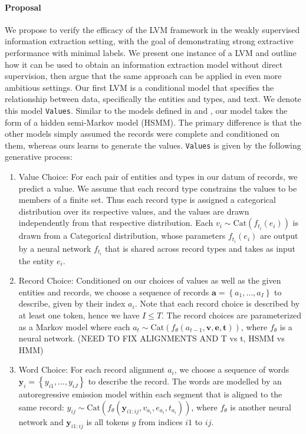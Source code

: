 \documentclass[11pt]{article}
\newcommand\set[1]{\left\{#1\right\}}
\newcommand{\Cat}{\mathrm{Cat}}
\newcommand{\ba}{\mathbf{a}}
\newcommand{\be}{\mathbf{e}}
\newcommand{\bt}{\mathbf{t}}
\newcommand{\bv}{\mathbf{v}}
\newcommand{\by}{\mathbf{y}}
\begin{document}
\paragraph{Proposal}
We propose to verify the efficacy of the LVM framework in the
weakly supervised information extraction setting,
with the goal of demonstrating strong extractive performance with minimal labels.
We present one instance of a LVM and outline how it can be used to obtain
an information extraction model without direct supervision,
then argue that the same approach can be applied in even more ambitious settings.
Our first LVM is a conditional model that specifies
the relationship between data, specifically the entities and types, and text.
We denote this model \texttt{Values}.
Similar to the models defined in \citet{wiseman2018template} and \citet{liang2009semalign},
our model takes the form of a hidden semi-Markov model (HSMM).
The primary difference is that the other models simply assumed the records
were complete and conditioned on them, whereas ours learns to generate the values.
\texttt{Values} is given by the following generative process:
\begin{enumerate}
\item Value Choice:
For each pair of entities and types in our datum of records, we predict a value.
We assume that each record type constrains the values to be members of a finite set.
Thus each record type is assigned a categorical distribution over its respective values,
and the values are drawn independently from that respective distribution.
Each $v_i\sim\Cat(f_{t_i}(e_i))$ is drawn from a Categorical distribution,
whose parameters $f_{t_i}(e_i)$ are output by a neural network $f_{t_i}$ that is shared across record types
and takes as input the entity $e_i$.
\item Record Choice:
Conditioned on our choices of values as well as the given entities and records,
we choose a sequence of records $\ba = \set{a_1,\ldots,a_I}$ to describe,
given by their index $a_i$.
Note that each record choice is described by at least one token, hence we have $I \le T$.
The record choices are parameterized as a Markov model where each
$a_t\sim\Cat(f_\theta(a_{t-1},\bv,\be,\bt))$,
where $f_\theta$ is a neural network.
(NEED TO FIX ALIGNMENTS AND T vs t, HSMM vs HMM)
\item Word Choice:
For each record alignment $a_i$,
we choose a sequence of words $\by_i = \set{y_{i1},\ldots,y_{iJ}}$ to describe the record.
The words are modelled by an autoregressive emission model within each segment
that is aligned to the same record:
$y_{ij}\sim\Cat(f_\theta(\by_{i1:ij},v_{a_i},e_{a_i},t_{a_i}))$,
where $f_\theta$ is another neural network and $\by_{i1:ij}$ is all tokens $y$ from indices
$i1$ to $ij$.
\end{enumerate}
\end{document}
